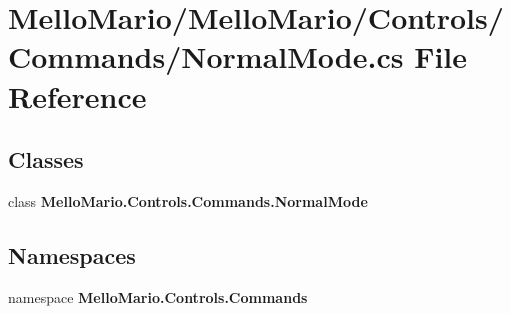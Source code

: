 \section{Mello\+Mario/\+Mello\+Mario/\+Controls/\+Commands/\+Normal\+Mode.cs File Reference}
\label{NormalMode_8cs}
\subsection*{Classes}
\begin{DoxyCompactItemize}
\item 
class \textbf{ Mello\+Mario.\+Controls.\+Commands.\+Normal\+Mode}
\end{DoxyCompactItemize}
\subsection*{Namespaces}
\begin{DoxyCompactItemize}
\item 
namespace \textbf{ Mello\+Mario.\+Controls.\+Commands}
\end{DoxyCompactItemize}
